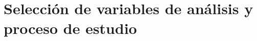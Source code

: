 \chapter{Selección de variables de análisis y proceso de estudio}
\label{cha:seleccion de variables de analisis y proceso de estudio}